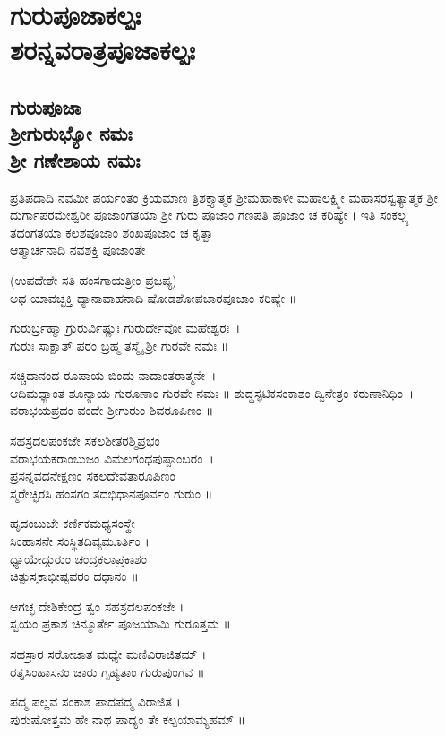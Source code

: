 \part*{ಗುರುಪೂಜಾಕಲ್ಪಃ\\ಶರನ್ನವರಾತ್ರಪೂಜಾಕಲ್ಪಃ}
\chapter*{\center ಗುರುಪೂಜಾ  \\ \Large ಶ್ರೀಗುರುಭ್ಯೋ ನಮಃ\\
\thispagestyle{empty}
ಶ್ರೀ ಗಣೇಶಾಯ ನಮಃ}

ಪ್ರತಿಪದಾದಿ ನವಮೀ ಪರ್ಯಂತಂ ಕ್ರಿಯಮಾಣ ತ್ರಿಶಕ್ತ್ಯಾತ್ಮಕ ಶ್ರೀಮಹಾಕಾಳೀ ಮಹಾಲಕ್ಷ್ಮೀ ಮಹಾಸರಸ್ವತ್ಯಾತ್ಮಕ ಶ್ರೀ ದುರ್ಗಾಪರಮೇಶ್ವರೀ ಪೂಜಾಂಗತಯಾ  ಶ್ರೀ ಗುರು ಪೂಜಾಂ ಗಣಪತಿ ಪೂಜಾಂ ಚ ಕರಿಷ್ಯೇ । ಇತಿ ಸಂಕಲ್ಪ್ಯ\\
ತದಂಗತಯಾ ಕಲಶಪೂಜಾಂ ಶಂಖಪೂಜಾಂ ಚ ಕೃತ್ವಾ \\ಆತ್ಮಾರ್ಚನಾದಿ ನವಶಕ್ತಿ ಪೂಜಾಂತೇ

(ಉಪದೇಶೇ ಸತಿ ಹಂಸಗಾಯತ್ರೀಂ ಪ್ರಜಪ್ಯ)\\
ಅಥ ಯಾವಚ್ಛಕ್ತಿ ಧ್ಯಾನಾವಾಹನಾದಿ ಷೋಡಶೋಪಚಾರಪೂಜಾಂ ಕರಿಷ್ಯೇ ॥

ಗುರುರ್ಬ್ರಹ್ಮಾ ಗ್ರುರುರ್ವಿಷ್ಣುಃ ಗುರುರ್ದೇವೋ ಮಹೇಶ್ವರಃ~।\\
ಗುರುಃ ಸಾಕ್ಷಾತ್ ಪರಂ ಬ್ರಹ್ಮ ತಸ್ಮೈ ಶ್ರೀ ಗುರವೇ ನಮಃ ॥

ಸಚ್ಚಿದಾನಂದ ರೂಪಾಯ ಬಿಂದು ನಾದಾಂತರಾತ್ಮನೇ~।\\
ಆದಿಮಧ್ಯಾಂತ ಶೂನ್ಯಾಯ ಗುರೂಣಾಂ ಗುರವೇ ನಮಃ ॥
\newpage
ಶುದ್ಧಸ್ಫಟಿಕಸಂಕಾಶಂ ದ್ವಿನೇತ್ರಂ ಕರುಣಾನಿಧಿಂ~।\\
ವರಾಭಯಪ್ರದಂ ವಂದೇ ಶ್ರೀಗುರುಂ ಶಿವರೂಪಿಣಂ ॥

ಸಹಸ್ರದಲಪಂಕಜೇ ಸಕಲಶೀತರಶ್ಮಿಪ್ರಭಂ\\
ವರಾಭಯಕರಾಂಬುಜಂ ವಿಮಲಗಂಧಪುಷ್ಪಾಂಬರಂ~।\\
ಪ್ರಸನ್ನವದನೇಕ್ಷಣಂ ಸಕಲದೇವತಾರೂಪಿಣಂ\\
ಸ್ಮರೇಚ್ಛಿರಸಿ ಹಂಸಗಂ ತದಭಿಧಾನಪೂರ್ವಂ ಗುರುಂ ॥
 
ಹೃದಂಬುಜೇ ಕರ್ಣಿಕಮಧ್ಯಸಂಸ್ಥೇ\\
ಸಿಂಹಾಸನೇ ಸಂಸ್ಥಿತದಿವ್ಯಮೂರ್ತಿಂ ।\\
ಧ್ಯಾಯೇದ್ಗುರುಂ ಚಂದ್ರಕಲಾಪ್ರಕಾಶಂ\\
ಚಿತ್ಪುಸ್ತಕಾಭೀಷ್ಟವರಂ ದಧಾನಂ ॥

 ಆಗಚ್ಛ ದೇಶಿಕೇಂದ್ರ ತ್ವಂ ಸಹಸ್ರದಲಪಂಕಜೇ ।\\
 ಸ್ವಯಂ ಪ್ರಕಾಶ ಚಿನ್ಮೂರ್ತೇ ಪೂಜಯಾಮಿ ಗುರೂತ್ತಮ ॥

ಸಹಸ್ರಾರ ಸರೋಜಾತ ಮಧ್ಯೇ ಮಣಿವಿರಾಜಿತಮ್ ।\\
ರತ್ನಸಿಂಹಾಸನಂ ಚಾರು ಗೃಹ್ಯತಾಂ ಗುರುಪುಂಗವ ॥

ಪದ್ಮ ಪಲ್ಲವ ಸಂಕಾಶ ಪಾದಪದ್ಮ ವಿರಾಜಿತ ।\\
ಪುರುಷೋತ್ತಮ ಹೇ ನಾಥ ಪಾದ್ಯಂ ತೇ ಕಲ್ಪಯಾಮ್ಯಹಮ್ ॥ 


